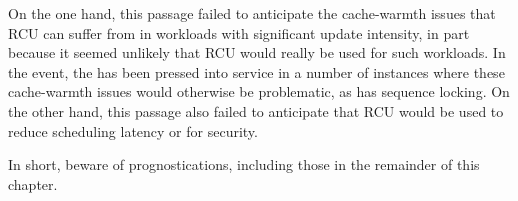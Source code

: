 On the one hand, this passage failed to anticipate the cache-warmth
issues that RCU can suffer from in workloads with significant update
intensity, in part because it seemed unlikely that RCU would really
be used for such workloads.
In the event, the  has been pressed into
service in a number of instances where these cache-warmth issues would
otherwise be problematic, as has sequence locking.
On the other hand, this passage also failed to anticipate that
RCU would be used to reduce scheduling latency or for security.

In short, beware of prognostications, including those in the remainder
of this chapter.
